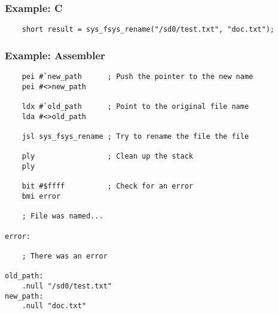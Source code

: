 \subsubsection*{Example: C}
\begin{lstlisting}
    short result = sys_fsys_rename("/sd0/test.txt", "doc.txt");
\end{lstlisting}

\subsubsection*{Example: Assembler}
\begin{verbatim}
    pei #`new_path      ; Push the pointer to the new name
    pei #<>new_path

    ldx #`old_path      ; Point to the original file name
    lda #<>old_path

    jsl sys_fsys_rename ; Try to rename the file the file

    ply                 ; Clean up the stack
    ply

    bit #$ffff          ; Check for an error
    bmi error

    ; File was named...

error:

    ; There was an error

old_path:
    .null "/sd0/test.txt"
new_path:
    .null "doc.txt"
\end{verbatim}



